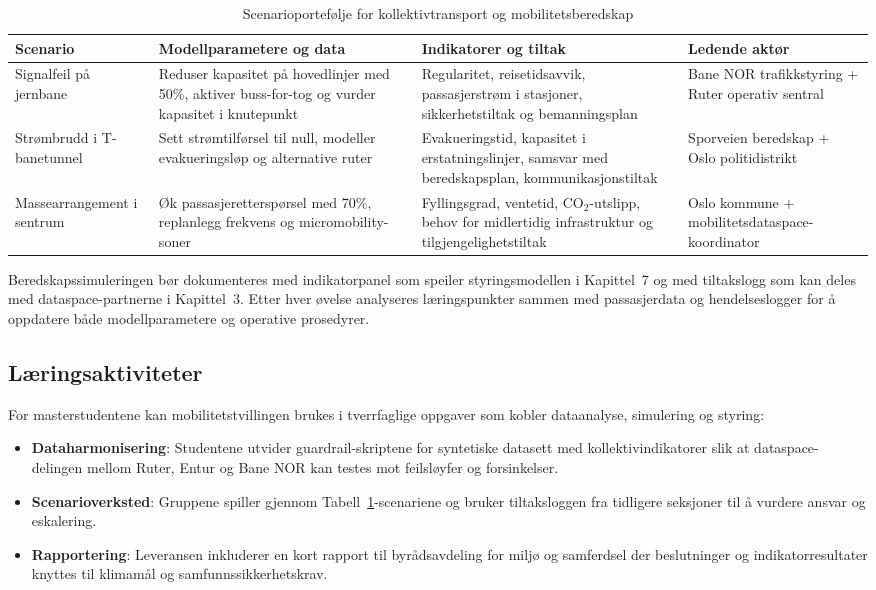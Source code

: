 \begin{table}[ht]
    \centering
    \caption{Scenarioportefølje for kollektivtransport og mobilitetsberedskap}
    \label{tab:beredskap-mobilitet}
    \begin{tabular}{|p{3.2cm}|p{4.6cm}|p{4.6cm}|p{3.0cm}|}
        \hline
        \textbf{Scenario} & \textbf{Modellparametere og data} & \textbf{Indikatorer og tiltak} & \textbf{Ledende aktør} \\
        \hline
        Signalfeil på jernbane & Reduser kapasitet på hovedlinjer med 50\%, aktiver buss-for-tog og vurder kapasitet i knutepunkt & Regularitet, reisetidsavvik, passasjerstrøm i stasjoner, sikkerhetstiltak og bemanningsplan & Bane NOR trafikkstyring + Ruter operativ sentral \\
        \hline
        Strømbrudd i T-banetunnel & Sett strømtilførsel til null, modeller evakueringsløp og alternative ruter & Evakueringstid, kapasitet i erstatningslinjer, samsvar med beredskapsplan, kommunikasjonstiltak & Sporveien beredskap + Oslo politidistrikt \\
        \hline
        Massearrangement i sentrum & Øk passasjeretterspørsel med 70\%, replanlegg frekvens og micromobility-soner & Fyllingsgrad, ventetid, CO$_2$-utslipp, behov for midlertidig infrastruktur og tilgjengelighetstiltak & Oslo kommune + mobilitetsdataspace-koordinator \\
        \hline
    \end{tabular}
\end{table}

Beredskapssimuleringen bør dokumenteres med indikatorpanel som speiler styringsmodellen i Kapittel~7 og med tiltakslogg som kan deles med dataspace-partnerne i Kapittel~3. Etter hver øvelse analyseres læringspunkter sammen med passasjerdata og hendelseslogger for å oppdatere både modellparametere og operative prosedyrer.

\subsection{Læringsaktiviteter}
For masterstudentene kan mobilitetstvillingen brukes i tverrfaglige oppgaver som kobler dataanalyse, simulering og styring:
\begin{itemize}
    \item \textbf{Dataharmonisering}: Studentene utvider guardrail-skriptene for syntetiske datasett med kollektivindikatorer slik at dataspace-delingen mellom Ruter, Entur og Bane NOR kan testes mot feilsløyfer og forsinkelser.
    \item \textbf{Scenarioverksted}: Gruppene spiller gjennom Tabell~\ref{tab:beredskap-mobilitet}-scenariene og bruker tiltaksloggen fra tidligere seksjoner til å vurdere ansvar og eskalering.
    \item \textbf{Rapportering}: Leveransen inkluderer en kort rapport til byrådsavdeling for miljø og samferdsel der beslutninger og indikatorresultater knyttes til klimamål og samfunnssikkerhetskrav.
\end{itemize}

